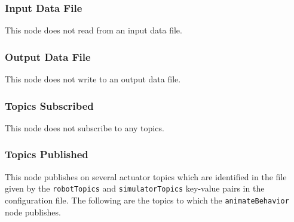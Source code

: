 \documentclass{CSSRforAfrica}
\begin{document}
\subsubsection*{Input Data File}
This node does not read from an input data file.


\subsubsection*{Output Data File}
This node does not write to an output data file.


\subsubsection*{Topics Subscribed}
This node does not subscribe to any topics.


\subsubsection*{Topics Published}
This node publishes on several actuator topics which are identified in the file given by the {\small \verb+robotTopics+ }  and {\small \verb+simulatorTopics+}  key-value pairs in the configuration file.
The following are the topics to which the {\small \verb+animateBehavior+} node publishes.
 
\end{document}
